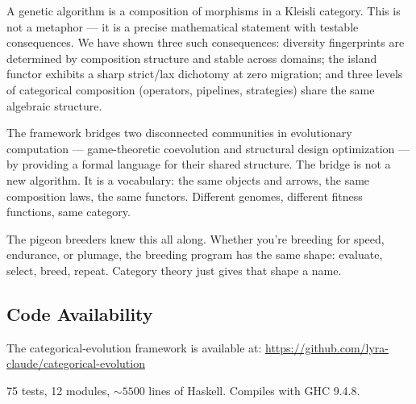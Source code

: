 \documentclass[10pt]{article}
\begin{document}
A genetic algorithm is a composition of morphisms in a Kleisli category. This is not a metaphor --- it is a precise mathematical statement with testable consequences. We have shown three such consequences: diversity fingerprints are determined by composition structure and stable across domains; the island functor exhibits a sharp strict/lax dichotomy at zero migration; and three levels of categorical composition (operators, pipelines, strategies) share the same algebraic structure.

The framework bridges two disconnected communities in evolutionary computation --- game-theoretic coevolution and structural design optimization --- by providing a formal language for their shared structure. The bridge is not a new algorithm. It is a vocabulary: the same objects and arrows, the same composition laws, the same functors. Different genomes, different fitness functions, same category.

The pigeon breeders knew this all along. Whether you're breeding for speed, endurance, or plumage, the breeding program has the same shape: evaluate, select, breed, repeat. Category theory just gives that shape a name.

\subsection*{Code Availability}

The categorical-evolution framework is available at: \url{https://github.com/lyra-claude/categorical-evolution}

75 tests, 12 modules, ${\sim}5500$ lines of Haskell. Compiles with GHC 9.4.8.
\end{document}
